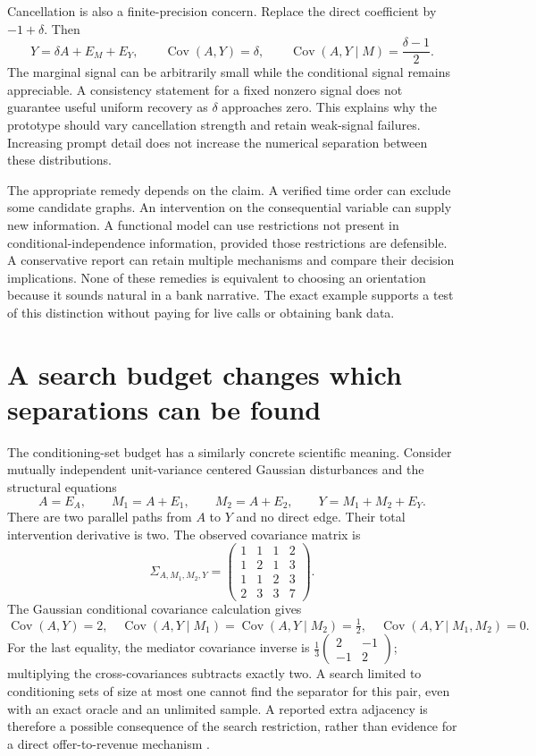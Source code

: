 Cancellation is also a finite-precision concern. Replace the direct
coefficient by $-1+\delta$. Then
\[
 Y=\delta A+E_M+E_Y,\qquad
 \operatorname{Cov}(A,Y)=\delta,
 \qquad \operatorname{Cov}(A,Y\mid M)=\frac{\delta-1}{2}.
\]
The marginal signal can be arbitrarily small while the conditional signal
remains appreciable. A consistency statement for a fixed nonzero signal does
not guarantee useful uniform recovery as $\delta$ approaches zero. This
explains why the prototype should vary cancellation strength and retain
weak-signal failures. Increasing prompt detail does not increase the numerical
separation between these distributions.

The appropriate remedy depends on the claim. A verified time order can exclude
some candidate graphs. An intervention on the consequential variable can
supply new information. A functional model can use restrictions not present
in conditional-independence information, provided those restrictions are
defensible. A conservative report can retain multiple mechanisms and compare
their decision implications. None of these remedies is equivalent to choosing
an orientation because it sounds natural in a bank narrative. The exact
example supports a test of this distinction without paying for live calls or
obtaining bank data.

\section{A search budget changes which separations can be found}
\label{exec14:l4-depth-example}

The conditioning-set budget has a similarly concrete scientific meaning.
Consider mutually independent unit-variance centered Gaussian disturbances
and the structural equations
\[
 A=E_A,\qquad M_1=A+E_1,\qquad M_2=A+E_2,
 \qquad Y=M_1+M_2+E_Y.
\]
There are two parallel paths from $A$ to $Y$ and no direct edge. Their total
intervention derivative is two. The observed covariance matrix is
\[
 \Sigma_{A,M_1,M_2,Y}=
 \begin{pmatrix}
 1&1&1&2\\1&2&1&3\\1&1&2&3\\2&3&3&7
 \end{pmatrix}.
\]
The Gaussian conditional covariance calculation gives
\[
 \operatorname{Cov}(A,Y)=2,\quad
 \operatorname{Cov}(A,Y\mid M_1)
 =\operatorname{Cov}(A,Y\mid M_2)=\tfrac12,
 \quad \operatorname{Cov}(A,Y\mid M_1,M_2)=0.
\]
For the last equality, the mediator covariance inverse is
$\frac13\left(\begin{smallmatrix}2&-1\\-1&2\end{smallmatrix}\right)$;
multiplying the cross-covariances subtracts exactly two. A search limited to
conditioning sets of size at most one cannot find the separator for this
pair, even with an exact oracle and an unlimited sample. A reported extra
adjacency is therefore a possible consequence of the search restriction,
rather than evidence for a direct offer-to-revenue mechanism
\citep{exec14_discovery_design_oracles}.

